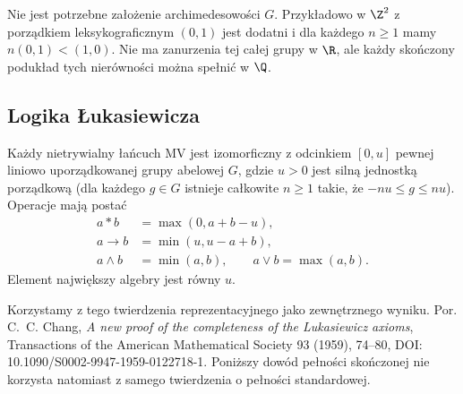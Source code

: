 Nie jest potrzebne założenie archimedesowości $G$.
Przykładowo w $\Z^2$ z porządkiem leksykograficznym
$(0,1)$ jest dodatni i dla każdego $n\geq1$ mamy
$n(0,1)<(1,0)$. Nie ma zanurzenia tej całej grupy
w $\R$, ale każdy skończony podukład tych nierówności
można spełnić w $\Q$.

\subsection{Logika Łukasiewicza}
\begin{twierdzenie}
\label{thm:lst-fuzzy-chang-representation}
Każdy nietrywialny łańcuch MV jest izomorficzny z odcinkiem
$[0,u]$ pewnej liniowo uporządkowanej grupy abelowej $G$,
gdzie $u>0$ jest silną jednostką porządkową
(dla każdego $g\in G$ istnieje całkowite $n\geq1$
takie, że $-nu\leq g\leq nu$). Operacje mają postać
\[
\begin{split}
 a*b&=\max(0,a+b-u),\\
 a\to b&=\min(u,u-a+b),\\
 a\wedge b&=\min(a,b),\qquad a\vee b=\max(a,b).
\end{split}
\]
Element największy algebry jest równy $u$.
\end{twierdzenie}
Korzystamy z tego twierdzenia reprezentacyjnego jako
zewnętrznego wyniku. Por. C.~C. Chang,
\emph{A new proof of the completeness of the
Lukasiewicz axioms}, Transactions of the American
Mathematical Society 93 (1959), 74--80,
DOI: 10.1090/S0002-9947-1959-0122718-1.
Poniższy dowód pełności skończonej nie korzysta natomiast
z samego twierdzenia o pełności standardowej.


